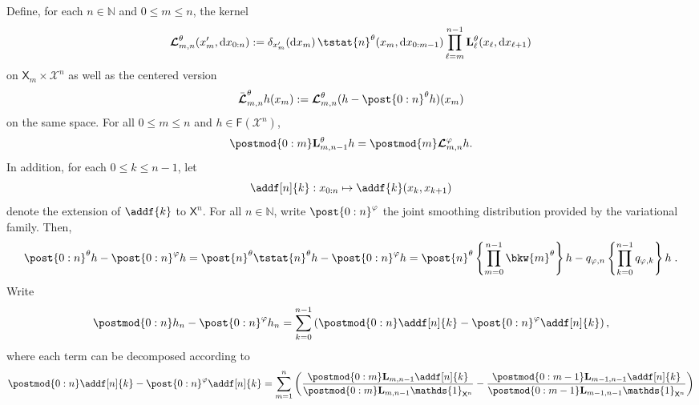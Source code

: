 \documentclass{article}
\newcommand{\Xfd}{\mathcal{X}}
\newcommand{\precpar}{\varphi}
\newcommand{\retrok}{\boldsymbol{\mathcal{L}}}
\newcommand{\retroknorm}{\bar{\boldsymbol{\mathcal{L}}}}
\newcommand{\nset}{\mathbb{N}}
\newcommand{\1}{\mathbbm{1}}
\newcommand{\retrokmod}{\boldsymbol{\mathcal{L}}^\precpar}
\newcommand{\uk}[1]{\mathbf{L}_{#1}}
\newcommand{\Xset}{\mathsf{X}}
\newcommand{\parvec}{\theta}
\newcommand{\bmf}[1]{\set{F}(#1)}
\newcommand{\set}[1]{\mathsf{#1}}
\def\1{\mathds{1}}
\newcommand{\rmd}{\ensuremath{\mathrm{d}}}
\newcommand{\eqdef}{\ensuremath{:=}}
\newcommand{\eqsp}{\;}
\begin{document}
Define, for each $n \in \nset$ and $0\leq m \leq n$, the kernel  
\begin{equation} \label{eq:def:retrok}
    \retrok_{m, n}^\parvec(x_m', \rmd x_{0:n}) \eqdef \delta_{x_m'}(\rmd x_m) \,  
    \tstat{n}^\parvec(x_m, \rmd x_{0:m - 1})
    \prod_{\ell = m}^{n - 1} \uk{\ell}^\parvec(x_\ell, \rmd x_{\ell + 1})
\end{equation}
on $\Xset_m \times \Xfd^n$ as well as the centered version 
$$
\retroknorm_{m, n}^\parvec h (x_m) \eqdef  \retrok_{m, n}^\parvec(h - \post{0:n}^\parvec h)(x_m) 
$$
on the same space.  For all $0\leq m \leq n$ and $h \in \bmf{\Xfd^n}$, 
\begin{equation} \label{eq:retro:prospective:id}
\postmod{0:m} \uk{m, n - 1}^\parvec h = \postmod{m} \retrokmod_{m, n} h.  
\end{equation}
In addition, for each $0\leq k \leq n - 1$, let 
\begin{equation} \label{eq:def:addf}
\addf[n]{k}: x_{0:n} \mapsto \addf{k}(x_k, x_{k + 1})  
\end{equation}
denote the extension of $\addf{k}$ to $\Xset^n$.  For all $n\in\nset$, write $\post{0:n}^{\varphi}$ the joint smoothing distribution provided by the variational family. Then,
$$
\post{0:n}^\parvec h - \post{0:n}^{\varphi} h= \post{n}^\parvec \tstat{n}^\parvec h - \post{0:n}^{\varphi} h =  \post{n}^\parvec \left\{\prod_{m = 0}^{n - 1} \bkw{m}^\parvec\right\} h - q_{\varphi,n}\left\{\prod_{k=0}^{n-1}q_{\varphi,k}\right\} h\eqsp.
$$
Write 
$$
\postmod{0:n} h_n - \post{0:n}^{\varphi} h_n = \sum_{k = 0}^{n - 1} \left( \postmod{0:n} \addf[n]{k} - \post{0:n}^{\varphi} \addf[n]{k} \right), 
$$
where each term can be decomposed according to   
\begin{equation*}
\postmod{0:n} \addf[n]{k} - \post{0:n}^\varphi \addf[n]{k} = 
\sum_{m = 1}^n \left( \frac{\postmod{0:m} \uk{m, n - 1} \addf[n]{k}}{\postmod{0:m} \uk{m, n - 1} \1_{\Xset^n}} - \frac{\postmod{0:m - 1} \uk{m - 1, n - 1} \addf[n]{k}}{\postmod{0:m - 1} \uk{m - 1, n - 1} \1_{\Xset^n}} \right)  
\end{equation*}
 
\end{document}
